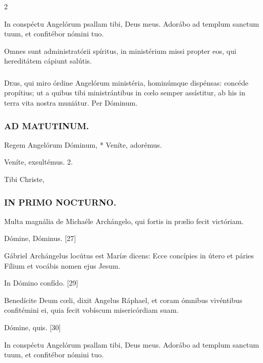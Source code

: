 \documentclass[9pt,twoside]{extarticle}
\begin{document}
\begin{multicols}{2}
\begin{tightlist}{}
\item {} In conspéctu Angelórum psallam tibi, Deus meus.  Adorábo ad templum sanctum tuum, et confitébor nómini tuo.
\item {} Omnes sunt administratórii spíritus, in ministérium missi propter eos, qui hereditátem cápiunt salútis.
\end{tightlist}

\subsubsection*{\center {}}
\lettrine{D}eus, qui miro órdine Angelórum ministéria, hominúmque dispénsas: concéde propítius; ut a quibus tibi ministrántibus in cœlo semper assístitur, ab his in terra vita nostra muniátur. Per Dóminum.

\subsubsection*{\center \textsc{AD MATUTINUM.}}
\begin{tightlist}{}
\item {} Regem Angelórum Dóminum, * Veníte, adorémus.
\item {} Veníte, exsultémus. 2.
\item {} Tibi Christe, 
\end{tightlist}

\subsubsection*{\center \textsc{IN PRIMO NOCTURNO.}}
\begin{tightlist}{}
\item {} Multa magnália de Michaéle Archángelo, qui fortis in prælio fecit victóriam.
\item {} Dómine, Dóminus. [27] 
\item {} Gábriel Archángelus locútus est Maríæ dicens: Ecce concípies in útero et páries Fílium et vocábis nomen ejus Jesum.
\item {} In Dómino confído. [29]
\item {} Benedícite Deum cœli, dixit Angelus Ráphael, et coram ómnibus vivéntibus confitémini ei, quia fecit vobíscum misericórdiam suam.
\item {} Dómine, quis. [30]
\item {} In conspéctu Angelórum psallam tibi, Deus meus.  Adorábo ad templum sanctum tuum, et confitébor nómini tuo.
\item {}
\end{tightlist}


\end{multicols}
\end{document}
